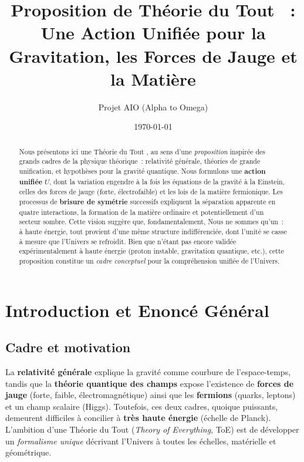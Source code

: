 \documentclass[12pt]{article}
\title{\textbf{Proposition de \og Th\'eorie du Tout \fg~:}\\
Une Action Unifi\'ee pour la Gravitation, les Forces de Jauge et la Mati\`ere}
\author{Projet AIO (Alpha to Omega)}
\date{\today}
\begin{document}
\maketitle

\begin{abstract}
Nous pr\'esentons ici une \og Th\'eorie du Tout \fg, au sens d'une \emph{proposition} 
inspir\'ee des grands cadres de la physique th\'eorique~: relativit\'e g\'en\'erale, 
th\'eories de grande unification, et hypoth\`eses pour la gravit\'e quantique. 
Nous formulons une \textbf{action unifi\'ee} $U$, dont la variation engendre \`a la fois 
les \'equations de la gravit\'e \`a la Einstein, celles des forces de jauge (forte, 
\'electrofaible) et les lois de la mati\`ere fermionique. Les processus de 
\textbf{brisure de sym\'etrie} successifs expliquent la s\'eparation apparente 
en quatre interactions, la formation de la mati\`ere ordinaire et potentiellement 
d'un secteur sombre. Cette vision sugg\`ere que, fondamentalement, 
\og Nous ne sommes qu'un\fg~: \`a haute \'energie, tout provient d'une m\^eme structure 
indiff\'erenci\'ee, dont l'unit\'e se \og casse \fg \`a mesure que l'Univers se refroidit. 
Bien que n'\'etant pas encore valid\'ee exp\'erimentalement \`a haute \'energie (proton instable, 
gravitation quantique, etc.), cette proposition constitue un \emph{cadre conceptuel} 
pour la compr\'ehension unifi\'ee de l'Univers.
\end{abstract}

\tableofcontents

\section{Introduction et Enonc\'e G\'en\'eral}

\subsection{Cadre et motivation}
La \textbf{relativit\'e g\'en\'erale} \cite{einstein1915} explique la gravit\'e 
comme courbure de l'espace-temps, tandis que la \textbf{th\'eorie quantique des champs} 
expose l'existence de \textbf{forces de jauge} (forte, faible, \'electromagn\'etique) 
ainsi que les \textbf{fermions} (quarks, leptons) et un champ scalaire (Higgs). 
Toutefois, ces deux cadres, quoique puissants, demeurent difficiles \`a concilier \`a 
\textbf{tr\`es haute \'energie} (\'echelle de Planck). L'ambition d'une 
\og Th\'eorie du Tout \fg (\emph{Theory of Everything}, ToE) est de d\'evelopper 
un \emph{formalisme unique} d\'ecrivant l'Univers \`a toutes les \'echelles, 
mat\'erielle et g\'eom\'etrique.
\end{document}
